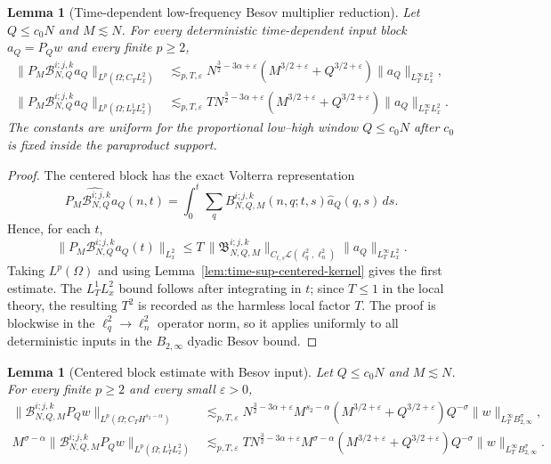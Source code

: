 \documentclass[10pt]{amsart}
\numberwithin{equation}{section}
\theoremstyle{plain}
\newtheorem{lemma}[theorem]{Lemma}
\theoremstyle{definition}
\theoremstyle{remark}
\newcommand{\Btwo}{B_{2,\infty}}
\newcommand{\eps}{\varepsilon}
\begin{document}
\begin{lemma}[Time-dependent low-frequency Besov multiplier reduction]\label{lem:low-frequency-besov-multiplier}
Let $Q\le c_0N$ and $M\lesssim N$.  For every deterministic time-dependent input block $a_Q=P_Qw$ and every finite $p\ge2$,
\begin{align}
 \|P_M\mathcal B_{N,Q}^{i;j,k}a_Q\|_{L^p(\Omega;C_TL^2_x)}
 &\lesssim_{p,T,\eps}
        N^{\frac32-3\alpha+\eps}(M^{3/2+\eps}+Q^{3/2+\eps})
        \|a_Q\|_{L_T^\infty L^2_x},
\label{eq:low-frequency-multiplier-reduction}\\
 \|P_M\mathcal B_{N,Q}^{i;j,k}a_Q\|_{L^p(\Omega;L_T^1L^2_x)}
 &\lesssim_{p,T,\eps}
        T
        N^{\frac32-3\alpha+\eps}(M^{3/2+\eps}+Q^{3/2+\eps})
        \|a_Q\|_{L_T^\infty L^2_x}.
\label{eq:low-frequency-multiplier-reduction-besov}
\end{align}
The constants are uniform for the proportional low--high window $Q\le c_0N$ after $c_0$ is fixed inside the paraproduct support.
\end{lemma}

\begin{proof}
The centered block has the exact Volterra representation
\[
        \widehat{P_M\mathcal B_{N,Q}^{i;j,k}a_Q}(n,t)
        =\int_0^t\sum_qB_{N,Q,M}^{i;j,k}(n,q;t,s)\widehat a_Q(q,s)\,ds.
\]
Hence, for each $t$,
\[
 \|P_M\mathcal B_{N,Q}^{i;j,k}a_Q(t)\|_{L^2_x}
 \le T\,\|\mathfrak B_{N,Q,M}^{i;j,k}\|_{C_{t,s}\mathcal L(\ell^2_q,\ell^2_n)}
       \|a_Q\|_{L_T^\infty L^2_x}.
\]
Taking $L^p(\Omega)$ and using Lemma~\ref{lem:time-sup-centered-kernel} gives the first estimate.  The $L_T^1L_x^2$ bound follows after integrating in $t$; since $T\le1$ in the local theory, the resulting $T^2$ is recorded as the harmless local factor $T$.  The proof is blockwise in the $\ell^2_q\to\ell^2_n$ operator norm, so it applies uniformly to all deterministic inputs in the $B_{2,\infty}$ dyadic Besov bound.
\end{proof}



\begin{lemma}[Centered block estimate with Besov input]\label{lem:positive-centered-block}
Let $Q\le c_0N$ and $M\lesssim N$.  For every finite $p\ge2$ and every small $\eps>0$,
\begin{align}
\|\mathcal B_{N,Q,M}^{i;j,k}P_Qw\|_{L^p(\Omega;C_TH^{s_2-\alpha})}
&\lesssim_{p,T,\eps}
N^{\frac32-3\alpha+\eps}
M^{s_2-\alpha}(M^{3/2+\eps}+Q^{3/2+\eps})
Q^{-\sigma}
\|w\|_{L_T^\infty\Btwo^\sigma},
\label{eq:positive-centered-block}\\
M^{\sigma-\alpha}
\|\mathcal B_{N,Q,M}^{i;j,k}P_Qw\|_{L^p(\Omega;L_T^1L^2_x)}
&\lesssim_{p,T,\eps}
T
N^{\frac32-3\alpha+\eps}
M^{\sigma-\alpha}(M^{3/2+\eps}+Q^{3/2+\eps})
Q^{-\sigma}
\|w\|_{L_T^\infty\Btwo^\sigma}.
\label{eq:positive-centered-block-besov}
\end{align}
\end{lemma}
\end{document}
